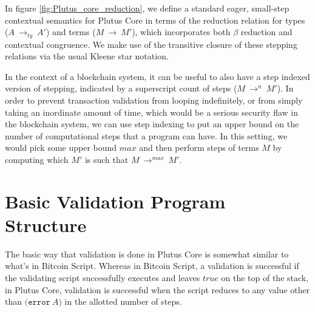 \documentclass[conference]{IEEEtran}
\newcommand{\keyword}[1]{\texttt{#1}}
\newcommand{\construct}[1]{\texttt{(} #1 \texttt{)}}
\newcommand{\error}[1]{\construct{\keyword{error} ~ #1}}
\newcommand{\typeStep}[2]{#1 ~ \rightarrow_{ty} ~ #2}
\newcommand{\step}[2]{#1 ~ \rightarrow ~ #2}
\newcommand{\multistepIndexed}[3]{#1 ~ \rightarrow^{#2} ~ #3}
\begin{document}
In figure \ref{fig:Plutus_core_reduction}, we define a standard eager, small-step contextual semantics for Plutus Core in terms of the reduction relation for types (\(\typeStep{A}{A'}\)) and terms (\(\step{M}{M'}\)), which incorporates both $\beta$ reduction and contextual congruence. We make use of the transitive closure of these stepping relations via the usual Kleene star notation.

In the context of a blockchain system, it can be useful to also have a step indexed version of stepping, indicated by a superscript count of steps (\(\multistepIndexed{M}{n}{M'}\)). In order to prevent transaction validation from looping indefinitely, or from simply taking an inordinate amount of time, which would be a serious security flaw in the blockchain system, we can use step indexing to put an upper bound on the number of computational steps that a program can have. In this setting, we would pick some upper bound $\mathit{max}$ and then perform steps of terms $M$ by computing which $M'$ is such that \(\multistepIndexed{M}{\mathit{max}}{M'}\).











\section{Basic Validation Program Structure}

The basic way that validation is done in Plutus Core is somewhat similar to what's in Bitcoin Script. Whereas in Bitcoin Script, a validation is successful if the validating script successfully executes and leaves $\textit{true}$ on the top of the stack, in Plutus Core, validation is successful when the script reduces to any value other than \(\error{A}\) in the allotted number of steps.









%

%
\end{document}
